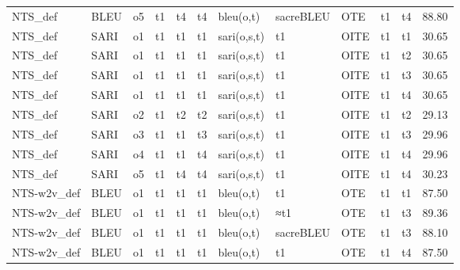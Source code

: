 \begin{tabular}{lllllllllllr}
     NTS\_def &      BLEU &     o5 &      t1 &         t4 &       t4 &    bleu(o,t) &  sacreBLEU &       OTE &       t1 &           t4 &                   88.80 \\
     NTS\_def &      SARI &     o1 &      t1 &         t1 &       t1 &  sari(o,s,t) &         t1 &      OITE &       t1 &           t1 &                   30.65 \\
     NTS\_def &      SARI &     o1 &      t1 &         t1 &       t1 &  sari(o,s,t) &         t1 &      OITE &       t1 &           t2 &                   30.65 \\
     NTS\_def &      SARI &     o1 &      t1 &         t1 &       t1 &  sari(o,s,t) &         t1 &      OITE &       t1 &           t3 &                   30.65 \\
     NTS\_def &      SARI &     o1 &      t1 &         t1 &       t1 &  sari(o,s,t) &         t1 &      OITE &       t1 &           t4 &                   30.65 \\
     NTS\_def &      SARI &     o2 &      t1 &         t2 &       t2 &  sari(o,s,t) &         t1 &      OITE &       t1 &           t2 &                   29.13 \\
     NTS\_def &      SARI &     o3 &      t1 &         t1 &       t3 &  sari(o,s,t) &         t1 &      OITE &       t1 &           t3 &                   29.96 \\
     NTS\_def &      SARI &     o4 &      t1 &         t1 &       t4 &  sari(o,s,t) &         t1 &      OITE &       t1 &           t4 &                   29.96 \\
     NTS\_def &      SARI &     o5 &      t1 &         t4 &       t4 &  sari(o,s,t) &         t1 &      OITE &       t1 &           t4 &                   30.23 \\
 NTS-w2v\_def &      BLEU &     o1 &      t1 &         t1 &       t1 &   bleu(o,t)  &         t1 &      OTE  &       t1 &           t1 &                   87.50 \\
 NTS-w2v\_def &      BLEU &     o1 &      t1 &         t1 &       t1 &   bleu(o,t)  &        ≈t1 &      OTE  &       t1 &           t3 &                   89.36 \\
 NTS-w2v\_def &      BLEU &     o1 &      t1 &         t1 &       t1 &   bleu(o,t)  &  sacreBLEU &      OTE  &       t1 &           t3 &                   88.10 \\
 NTS-w2v\_def &      BLEU &     o1 &      t1 &         t1 &       t1 &    bleu(o,t) &         t1 &       OTE &       t1 &           t4 &                   87.50 \\

\end{tabular}
